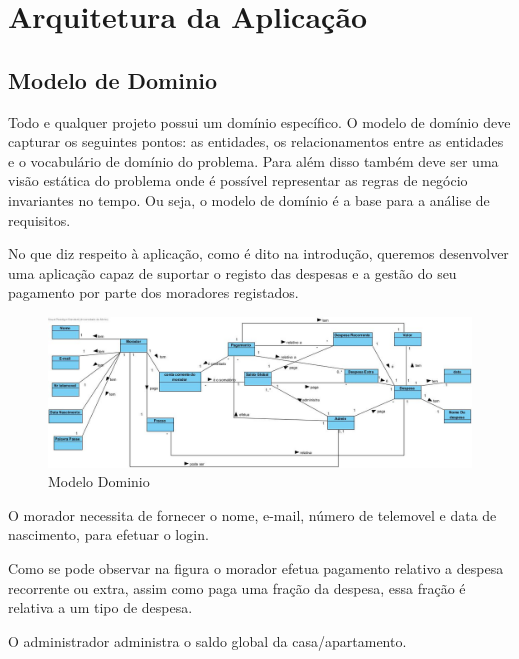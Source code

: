 \chapter{Arquitetura da Aplicação}

\section{Modelo de Dominio }
Todo e qualquer projeto possui um domínio específico. O modelo de domínio deve capturar os seguintes pontos: as entidades, os relacionamentos entre as entidades e o vocabulário de domínio do problema. Para além disso também deve ser uma visão estática do problema onde é possível representar as regras de negócio invariantes no tempo. Ou seja, o modelo de domínio é a base para a análise de requisitos.

No que diz respeito à aplicação, como é dito na introdução, queremos desenvolver uma aplicação capaz de suportar o registo das despesas e a gestão do seu pagamento por parte dos moradores registados.


\begin{figure}[htb!]
	\includegraphics[scale=0.566]{ModeloDominio}  
	\caption{Modelo Dominio}  
\end{figure}

O morador necessita de fornecer o nome, e-mail, número de telemovel e data de nascimento, para efetuar o login. 

Como se pode observar na figura o morador efetua pagamento relativo a despesa recorrente ou extra, assim como paga uma fração da despesa, essa fração é relativa a um tipo de despesa. 


O administrador administra o saldo global da casa/apartamento. 


\newpage

